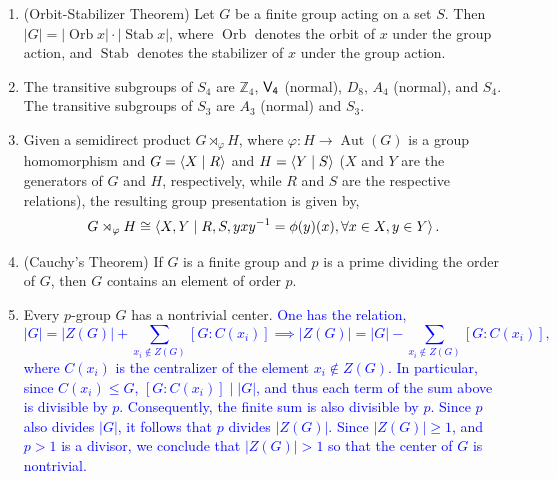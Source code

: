 \documentclass{article}
\newcommand{\expl}[1]{\textcolor{blue}{#1}}
\begin{document}
\begin{enumerate}[resume = algebra]
		If $\ker{\varphi} = \{e\}$ is trivial, then $G$ embeds in $S_{n}$ (i.e., $G$ is isomorphic to a subgroup of $S_n$) and $|G| \mid |S_{n}|$. \newline 
		\expl{Suppose $g \in \ker{\varphi}$. Then for every $x \in G$, $gxH = xH \implies x^{-1}gx \in H \implies g \in xHx^{-1}$. Thus, $\ker{\varphi} \subseteq \bigcap_{g \in G}gHg^{-1}$. The converse direction follows immediately.}
		\item (Orbit-Stabilizer Theorem) Let $G$ be a finite group acting on a set $S$. Then $|G| = |\operatorname{Orb}{x}|\cdot |\operatorname{Stab}{x}|$, where $\operatorname{Orb}$ denotes the orbit of $x$ under the group action, and $\operatorname{Stab}$ denotes the stabilizer of $x$ under the group action.
		\item The transitive subgroups of $S_{4}$ are $\mathbb{Z}_{4}$, $\sf{V}_{4}$ (normal), $D_{8}$, $A_{4}$ (normal), and $S_{4}$.  The transitive subgroups of $S_{3}$ are $A_{3}$ (normal) and $S_{3}$. 
		\item Given a semidirect product $G \rtimes_{\varphi} H$, where $\varphi: H \to \operatorname{Aut}(G)$ is a group homomorphism and $G = \braket{X \mid R}$ and $H = \braket{Y \mid S}$ ($X$ and $Y$ are the generators of $G$ and $H$, respectively, while $R$ and $S$ are the respective relations), the resulting group presentation is given by, 
		\begin{equation*}
			G \rtimes_{\varphi} H \cong \braket{X, Y \mid R, S, yxy^{-1} = \phi(y)(x), \forall x \in X, y \in Y}. 
		\end{equation*}
		\item (Cauchy's Theorem) If $G$ is a finite group and $p$ is a prime dividing the order of $G$, then $G$ contains an element of order $p$. 
		\item Every $p$-group $G$ has a nontrivial center. \newline \expl{
			One has the relation, 
			\begin{equation*}
				|G| = |Z(G)| + \sum_{x_{i} \notin Z(G)}[G: C(x_{i})] \implies |Z(G)| = |G| - \sum_{x_{i}\notin Z(G)}[G: C(x_i)], 
			\end{equation*}
			where $C(x_{i})$ is the centralizer of the element $x_i \notin Z(G)$. In particular, since $C(x_i) \leq G$, $[G: C(x_i)] \mid |G|$, and thus each term of the sum above is divisible by $p$. Consequently, the finite sum is also divisible by $p$. Since $p$ also divides $|G|$, it follows that $p$ divides $|Z(G)|$. Since $|Z(G)| \geq 1$, and $p > 1$ is a divisor, we conclude that $|Z(G)| > 1$ so that the center of $G$ is nontrivial. 
}
\end{enumerate}
\end{document}
